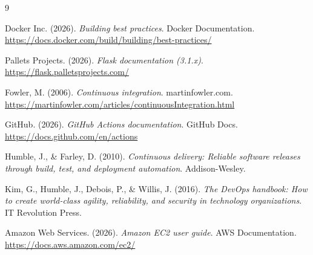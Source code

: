 \documentclass[12pt,letterpaper]{article}
\begin{document}
\renewcommand{\refname}{Fuentes de información}
\begin{thebibliography}{9}

Docker Inc. (2026). \textit{Building best practices}. Docker Documentation.
\url{https://docs.docker.com/build/building/best-practices/}

Pallets Projects. (2026). \textit{Flask documentation (3.1.x)}.
\url{https://flask.palletsprojects.com/}

Fowler, M. (2006). \textit{Continuous integration}. martinfowler.com.
\url{https://martinfowler.com/articles/continuousIntegration.html}

GitHub. (2026). \textit{GitHub Actions documentation}. GitHub Docs.
\url{https://docs.github.com/en/actions}

Humble, J., \& Farley, D. (2010). \textit{Continuous delivery: Reliable software releases through
build, test, and deployment automation}. Addison-Wesley.

Kim, G., Humble, J., Debois, P., \& Willis, J. (2016). \textit{The DevOps handbook: How to create
world-class agility, reliability, and security in technology organizations}. IT Revolution Press.

Amazon Web Services. (2026). \textit{Amazon EC2 user guide}. AWS Documentation.
\url{https://docs.aws.amazon.com/ec2/}

\end{thebibliography}
\end{document}
